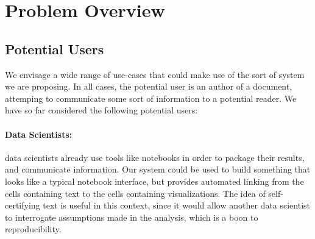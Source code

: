 \section{Problem Overview}
\label{sec:overview}

%
%

\subsection{Potential Users}
We envisage a wide range of use-cases that could make use of the sort of system we are proposing. In all
cases, the potential user is an author of a document, attemping to communicate some sort of information to a
potential reader. We have so far considered the following potential users:

\paragraph{Data Scientists:} data scientists already use tools like notebooks in order to package their
results, and communicate information. Our system could be used to build something that looks like a typical
notebook interface, but provides automated linking from the cells containing text to the cells containing
visualizations. The idea of self-certifying text is useful in this context, since it would allow another data
scientist to interrogate assumptions made in the analysis, which is a boon to reproducibility.

